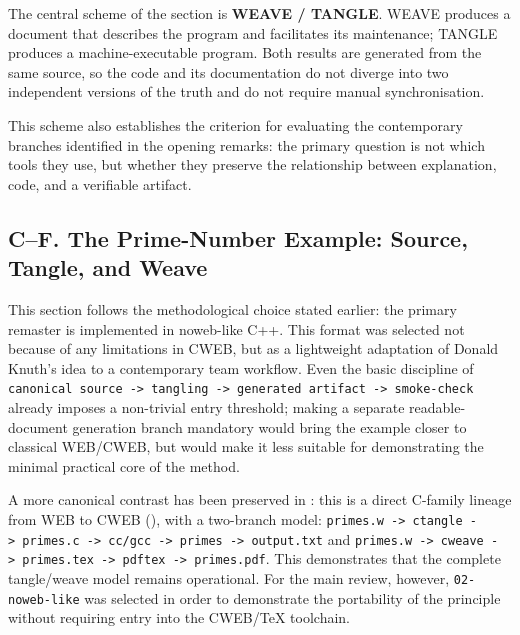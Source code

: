 \documentclass{ZGJournalArticle_2026}
\begin{document}
The central scheme of the section is \textbf{WEAVE / TANGLE}. WEAVE
produces a document that describes the program and facilitates its
maintenance; TANGLE produces a machine-executable program. Both results
are generated from the same source, so the code and its documentation do
not diverge into two independent versions of the truth and do not
require manual synchronisation.

This scheme also establishes the criterion for evaluating the
contemporary branches identified in the opening remarks: the primary
question is not which tools they use, but whether they preserve the
relationship between explanation, code, and a verifiable artifact.

\subsection{C--F. The Prime-Number Example: Source, Tangle, and
Weave}\label{cf.-the-prime-number-example-source-tangle-and-weave}

This section follows the methodological choice stated earlier: the
primary remaster is implemented in noweb-like C++. This format was
selected not because of any limitations in CWEB, but as a lightweight
adaptation of Donald Knuth's idea to a contemporary team workflow. Even
the basic discipline of
\texttt{canonical\ source\ -\textgreater{}\ tangling\ -\textgreater{}\ generated\ artifact\ -\textgreater{}\ smoke-check}
already imposes a non-trivial entry threshold; making a separate
readable-document generation branch mandatory would bring the example
closer to classical WEB/CWEB, but would make it less suitable for
demonstrating the minimal practical core of the method.

A more canonical contrast has been preserved in
{}:
this is a direct C-family lineage from WEB to CWEB
(), with a two-branch
model:
\texttt{primes.w\ -\textgreater{}\ ctangle\ -\textgreater{}\ primes.c\ -\textgreater{}\ cc/gcc\ -\textgreater{}\ primes\ -\textgreater{}\ output.txt}
and
\texttt{primes.w\ -\textgreater{}\ cweave\ -\textgreater{}\ primes.tex\ -\textgreater{}\ pdftex\ -\textgreater{}\ primes.pdf}.
This demonstrates that the complete tangle/weave model remains
operational. For the main review, however, \texttt{02-noweb-like} was
selected in order to demonstrate the portability of the principle
without requiring entry into the CWEB/TeX toolchain.
\end{document}

